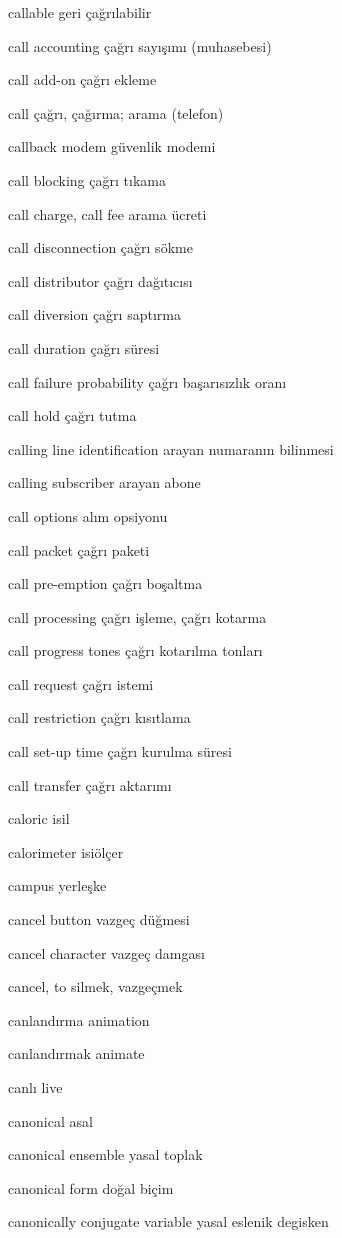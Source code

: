 \documentclass[12pt,fleqn]{article}\usepackage{../../common}
\begin{document}
callable geri çağrılabilir

call accounting çağrı sayışımı (muhasebesi)

call add-on çağrı ekleme

call çağrı, çağırma; arama (telefon)

callback modem güvenlik modemi

call blocking çağrı tıkama

call charge, call fee arama ücreti

call disconnection çağrı sökme

call distributor çağrı dağıtıcısı

call diversion çağrı saptırma

call duration çağrı süresi

call failure probability çağrı başarısızlık oranı

call hold çağrı tutma

calling line identification arayan numaranın bilinmesi

calling subscriber arayan abone

call options alım opsiyonu

call packet çağrı paketi

call pre-emption çağrı boşaltma

call processing çağrı işleme, çağrı kotarma

call progress tones çağrı kotarılma tonları

call request çağrı istemi

call restriction çağrı kısıtlama

call set-up time çağrı kurulma süresi

call transfer çağrı aktarımı

caloric isil

calorimeter isiölçer

campus yerleşke

cancel button vazgeç düğmesi

cancel character vazgeç damgası

cancel, to silmek, vazgeçmek

canlandırma animation

canlandırmak animate

canlı live

canonical asal

canonical ensemble yasal toplak

canonical form doğal biçim

canonically conjugate variable yasal eslenik degisken
\end{document}
